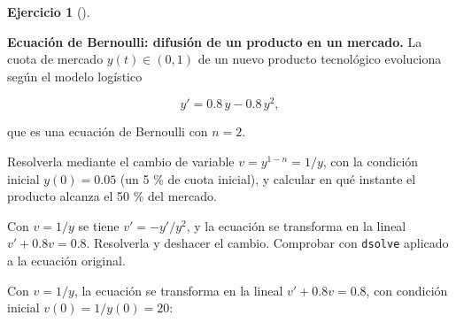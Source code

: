 \documentclass[
  spanish,
  a4paper,
]{scrreport}
\theoremstyle{definition}
\newtheorem{exercise}{Ejercicio}[chapter]
\theoremstyle{remark}
\begin{document}
\begin{exercise}[]\protect\hypertarget{exr-bernoulli-mercado}{}\label{exr-bernoulli-mercado}

\textbf{Ecuación de Bernoulli: difusión de un producto en un mercado.}
La cuota de mercado \(y(t)\in(0,1)\) de un nuevo producto tecnológico
evoluciona según el modelo logístico

\[
y' = 0.8\,y - 0.8\,y^2,
\]

que es una ecuación de Bernoulli con \(n=2\).

Resolverla mediante el cambio de variable \(v = y^{1-n} = 1/y\), con la
condición inicial \(y(0) = 0.05\) (un 5 \% de cuota inicial), y calcular
en qué instante el producto alcanza el 50 \% del mercado.

\begin{tcolorbox}[enhanced jigsaw, arc=.35mm, bottomrule=.15mm, bottomtitle=1mm, breakable, colback=white, colbacktitle=quarto-callout-note-color!10!white, colframe=quarto-callout-note-color-frame, coltitle=black, left=2mm, leftrule=.75mm, opacityback=0, opacitybacktitle=0.6, rightrule=.15mm, title=\textcolor{quarto-callout-note-color}{\faInfo}\hspace{0.5em}{Ayuda}, titlerule=0mm, toprule=.15mm, toptitle=1mm]

Con \(v = 1/y\) se tiene \(v' = -y'/y^2\), y la ecuación se transforma
en la lineal \(v' + 0.8v = 0.8\). Resolverla y deshacer el cambio.
Comprobar con \texttt{dsolve} aplicado a la ecuación original.

\end{tcolorbox}

\begin{tcolorbox}[enhanced jigsaw, arc=.35mm, bottomrule=.15mm, bottomtitle=1mm, breakable, colback=white, colbacktitle=quarto-callout-tip-color!10!white, colframe=quarto-callout-tip-color-frame, coltitle=black, left=2mm, leftrule=.75mm, opacityback=0, opacitybacktitle=0.6, rightrule=.15mm, title=\textcolor{quarto-callout-tip-color}{\faLightbulb}\hspace{0.5em}{Solución}, titlerule=0mm, toprule=.15mm, toptitle=1mm]

Con \(v = 1/y\), la ecuación se transforma en la lineal
\(v' + 0.8v = 0.8\), con condición inicial \(v(0) = 1/y(0) = 20\):


\end{tcolorbox}
\end{exercise}
\end{document}
